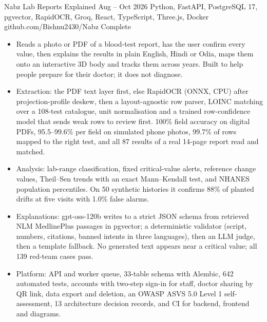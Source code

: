 
\cvproject
{Nabz}
{Lab Reports Explained}
{Aug -- Oct 2026}
{Python, FastAPI, PostgreSQL 17, pgvector, RapidOCR, Groq, React, TypeScript, Three.js, Docker}
{github.com/Bishnu2430/Nabz}
{Complete}
\begin{itemize}
\item Reads a photo or PDF of a blood-test report, has the user confirm every value, then explains the results in plain English, Hindi or Odia, maps them onto an interactive 3D body and tracks them across years. Built to help people prepare for their doctor; it does not diagnose.
\item Extraction: the PDF text layer first, else RapidOCR (ONNX, CPU) after projection-profile deskew, then a layout-agnostic row parser, LOINC matching over a 108-test catalogue, unit normalisation and a trained row-confidence model that sends weak rows to review first. 100\% field accuracy on digital PDFs, 95.5--99.6\% per field on simulated phone photos, 99.7\% of rows mapped to the right test, and all 87 results of a real 14-page report read and matched.
\item Analysis: lab-range classification, fixed critical-value alerts, reference change values, Theil--Sen trends with an exact Mann--Kendall test, and NHANES population percentiles. On 50 synthetic histories it confirms 88\% of planted drifts at five visits with 1.0\% false alarms.
\item Explanations: gpt-oss-120b writes to a strict JSON schema from retrieved NLM MedlinePlus passages in pgvector; a deterministic validator (script, numbers, citations, banned intents in three languages), then an LLM judge, then a template fallback. No generated text appears near a critical value; all 139 red-team cases pass.
\item Platform: API and worker queue, 33-table schema with Alembic, 642 automated tests, accounts with two-step sign-in for staff, doctor sharing by QR link, data export and deletion, an OWASP ASVS 5.0 Level 1 self-assessment, 13 architecture decision records, and CI for backend, frontend and diagrams.
\end{itemize}

\cvgap

